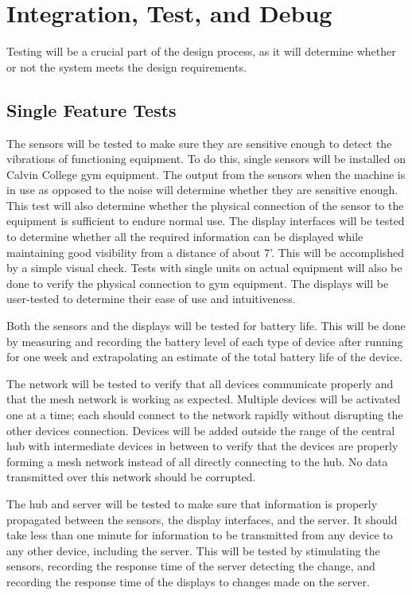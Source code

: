 \documentclass[PPFS.tex]{template/subfiles}
\begin{document}
\section{Integration, Test, and Debug}
Testing will be a crucial part of the design process, as it will determine whether or not the system meets the design requirements.

\subsection{Single Feature Tests}
The sensors will be tested to make sure they are sensitive enough to detect the vibrations of functioning equipment.  To do this, single sensors will be installed on Calvin College gym equipment. The output from the sensors when the machine is in use as opposed to the noise will determine whether they are sensitive enough. This test will also determine whether the physical connection of the sensor to the equipment is sufficient to endure normal use.
The display interfaces will be tested to determine whether all the required information can be displayed while maintaining good visibility from a distance of about 7'. This will be accomplished by a simple visual check. Tests with single units on actual equipment will also be done to verify the physical connection to gym equipment. The displays will be user-tested to determine their ease of use and intuitiveness.

Both the sensors and the displays will be tested for battery life. This will be done by measuring and recording the battery level of each type of device after running for one week and extrapolating an estimate of the total battery life of the device.

The network will be tested to verify that all devices communicate properly and that the mesh network is working as expected. Multiple devices will be activated one at a time; each should connect to the network rapidly without disrupting the other devices connection. Devices will be added outside the range of the central hub with intermediate devices in between to verify that the devices are properly forming a mesh network instead of all directly connecting to the hub. No data transmitted over this network should be corrupted.

The hub and server will be tested to make sure that information is properly propagated between the sensors, the display interfaces, and the server. It should take less than one minute for information to be transmitted from any device to any other device, including the server. This will be tested by stimulating the sensors, recording the response time of the server detecting the change, and recording the response time of the displays to changes made on the server.
\end{document}
